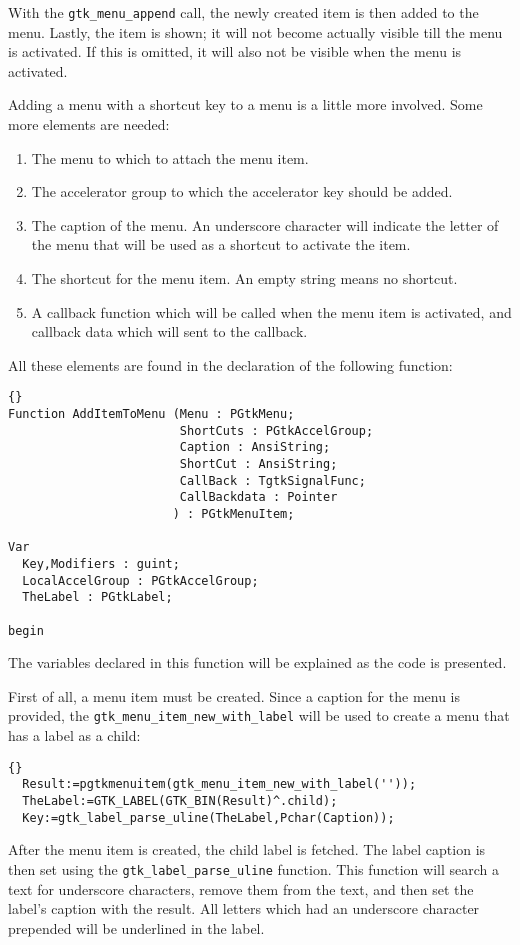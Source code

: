 \documentclass[10pt]{article}
\begin{document}
With the \lstinline|gtk_menu_append| call, the newly created item is then 
added to the menu. Lastly, the item is shown; it will not become actually
visible till the menu is activated. If this is omitted, it will also not
be visible when the menu is activated.

Adding a menu with a shortcut key to a menu is a little more involved. Some
more elements are needed:
\begin{enumerate}
\item The menu to which to attach the menu item.
\item The accelerator group to which the accelerator key should be added.
\item The caption of the menu. An underscore character will indicate the 
letter of the menu that will be used as a shortcut to activate the item.
\item The shortcut for the menu item. An empty string means no shortcut.
\item A callback function which will be called when the menu item is
activated, and callback data which will sent to the callback.
\end{enumerate}
All these elements are found in the declaration of the following function:
\begin{lstlisting}{}
Function AddItemToMenu (Menu : PGtkMenu;
                        ShortCuts : PGtkAccelGroup;
                        Caption : AnsiString;
                        ShortCut : AnsiString;
                        CallBack : TgtkSignalFunc;
                        CallBackdata : Pointer
                       ) : PGtkMenuItem; 

Var
  Key,Modifiers : guint;
  LocalAccelGroup : PGtkAccelGroup;
  TheLabel : PGtkLabel;
  
begin
\end{lstlisting}
The variables declared in this function will be explained as the code is
presented.

First of all, a menu item must be created. Since a caption for the menu is
provided, the \lstinline|gtk_menu_item_new_with_label| will be used to
create a menu that has a label as a child:
\begin{lstlisting}{}
  Result:=pgtkmenuitem(gtk_menu_item_new_with_label(''));
  TheLabel:=GTK_LABEL(GTK_BIN(Result)^.child);
  Key:=gtk_label_parse_uline(TheLabel,Pchar(Caption));
\end{lstlisting}
After the menu item is created, the child label is fetched. The label caption is
then set using the \lstinline|gtk_label_parse_uline| function. This function 
will search a text for underscore characters, remove them from the text, and
then set the label's caption with the result. All letters which had an
underscore character prepended will be underlined in the label.
\end{document}
